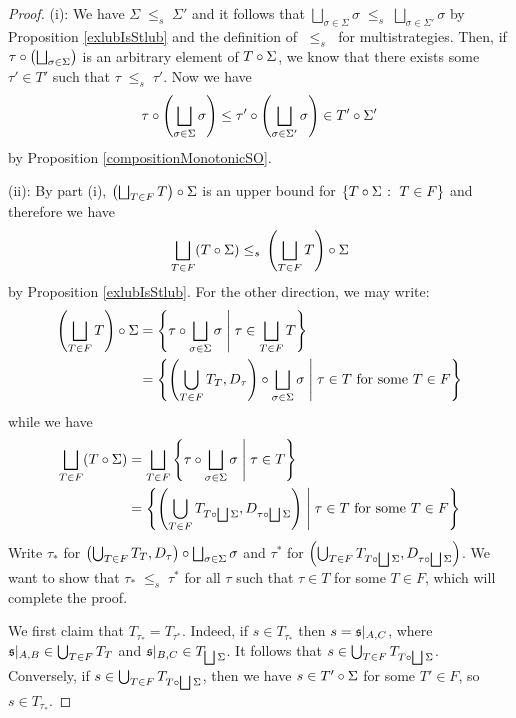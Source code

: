 \documentclass{entcs} \usepackage{prentcsmacro}
\newcommand{\stle}{{\;\le_s\;}}
\newcommand{\exlub}{\bigsqcup}
\newcommand{\0}{{\mathtt{0}}}
\newcommand{\Tau}{T}
\begin{document}
\begin{proof}
  (i): We have $\Sigma\stle\Sigma'$ and it follows that $\exlub_{\sigma\in\Sigma}\sigma\stle\exlub_{\sigma\in\Sigma'}\sigma$ by Proposition \ref{exlubIsStlub} and the definition of $\stle$ for multistrategies.  Then, if $\icomp\tau{\left(\exlub_{\sigma\in\Sigma}\right)}$ is an arbitrary element of $\icomp\Tau\Sigma$, we know that there exists some $\tau'\in \Tau'$ such that $\tau\stle\tau'$.  Now we have
  \[
    \icomp\tau{\left(\exlub_{\sigma\in\Sigma}\sigma\right)}\le\icomp{\tau'}{\left(\exlub_{\sigma\in\Sigma'}\sigma\right)}\in\icomp{\Tau'}{\Sigma'}
    \]
  by Proposition \ref{compositionMonotonicSO}.

  (ii): By part (i), $\icomp{\left(\exlub_{\Tau\in F}\Tau\right)}\Sigma$ is an upper bound for $\{\icomp\Tau\Sigma\suchthat \Tau\in F\}$ and therefore we have
  \[
    \exlub_{\Tau\in F}(\icomp\Tau\Sigma)\stle\icomp{\left(\exlub_{\Tau\in F}\Tau\right)}\Sigma
    \]
  by Proposition \ref{exlubIsStlub}.  For the other direction, we may write:
  \begin{align*}
    \icomp{\left(\exlub_{\Tau\in F}\Tau\right)}{\Sigma} & = \left\{\icomp\tau{\exlub_{\sigma\in\Sigma}\sigma}\;\middle|\;\tau\in\exlub_{\Tau\in F}\Tau\right\} \\
      & = \left\{\icomp{\left(\bigcup_{\Tau\in F}T_\Tau,D_\tau\right)}{\exlub_{\sigma\in\Sigma}\sigma}\;\middle|\;\textrm{$\tau\in\Tau$ for some $\Tau\in F$}\right\}
  \end{align*}
  while we have 
  \begin{align*}
    \exlub_{\Tau\in F}(\icomp\Tau\Sigma) & = \exlub_{\Tau\in F}\left\{\icomp\tau{\exlub_{\sigma\in\Sigma}\sigma}\;\middle|\;\tau\in\Tau\right\} \\
      & = \left\{\left(\bigcup_{\Tau\in F}T_{\icomp{\Tau}{\exlub \Sigma}},D_{\icomp\tau{\exlub\Sigma}}\right)\;\middle|\;\textrm{$\tau\in\Tau$ for some $\Tau\in F$}\right\}
  \end{align*}
  Write $\tau_*$ for $\icomp{\left(\bigcup_{\Tau\in F}T_\Tau,D_\tau\right)}{\exlub_{\sigma\in\Sigma}\sigma}$ and $\tau^*$ for $\left(\bigcup_{\Tau\in F}T_{\icomp{\Tau}{\exlub \Sigma}},D_{\icomp\tau{\exlub\Sigma}}\right)$.  We want to show that $\tau_*\stle\tau^*$ for all $\tau$ such that $\tau\in \Tau$ for some $\Tau\in F$, which will complete the proof.

  We first claim that $T_{\tau_*}=T_{\tau^*}$.  Indeed, if $s\in T_{\tau_*}$ then $s=\mathfrak s\vert_{A,C}$, where $\s\vert_{A,B}\in\bigcup_{\Tau\in F}T_\Tau$ and $\s\vert_{B,C}\in T_{\exlub\Sigma}$.  It follows that $s\in\bigcup_{\Tau\in F}T_{\icomp{\Tau}{\exlub\Sigma}}$.  Conversely, if $s\in\bigcup_{\Tau\in F} T_{\icomp{\Tau}{\exlub\Sigma}}$, then we have $s\in\icomp{\Tau'}\Sigma$ for some $\Tau'\in F$, so $s\in T_{\tau_*}$.  


\end{proof}
\end{document}
